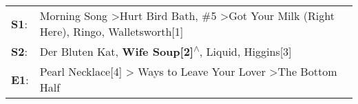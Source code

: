 \begin{supertabular}{p{0.03\textwidth}p{0.92\textwidth}}
 \textbf{S1}:  &  Morning Song\textsuperscript{} \textgreater \enspace Hurt Bird Bath\textsuperscript{}, \enspace \#5\textsuperscript{} \textgreater \enspace Got Your Milk (Right Here)\textsuperscript{}, \enspace Ringo\textsuperscript{}, \enspace Walletsworth[1]\textsuperscript{}  \enspace  \\
 \textbf{S2}:  &                                                                                                    Der Bluten Kat\textsuperscript{}, \enspace \textbf{Wife Soup[2]\textsuperscript{$\wedge$}}, \enspace Liquid\textsuperscript{}, \enspace Higgins[3]\textsuperscript{}  \enspace  \\
 \textbf{E1}:  &                                                                                                         Pearl Necklace[4]\textsuperscript{} \textgreater {} Ways to Leave Your Lover\textsuperscript{} \textgreater \enspace The Bottom Half\textsuperscript{}  \enspace  \\
\end{supertabular}
